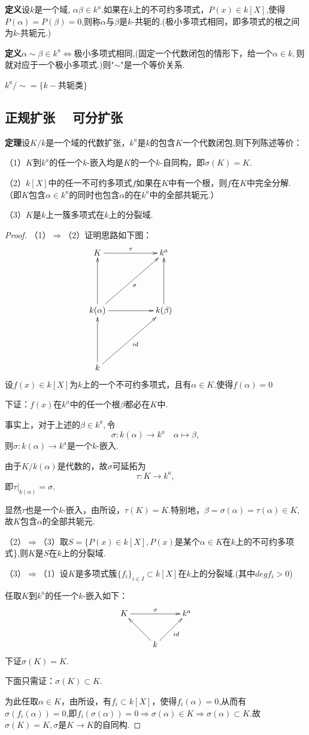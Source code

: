 \documentclass[UTF8]{article}
\begin{document}
\textbf{定义}\quad 设$k$是一个域, $\alpha \beta \in k^a.$如果在$k$上的不可约多项式，$P(x)\in k[X]$,使得$P(\alpha)=P(\beta)=0$,则称$\alpha$与$\beta$是$k$-共轭的.(极小多项式相同，即多项式的根之间为$k$-共轭元.)

\textbf{定义}\quad $\alpha\sim \beta\in k^a\iff $极小多项式相同,(固定一个代数闭包的情形下，给一个$\alpha\in k,$则就对应于一个极小多项式.)则"$\sim$"是一个等价关系.

$k^a/\sim=\{k-$共轭类\}

\subsection{正规扩张$\quad$ 可分扩张}
\normalsize

\textbf{定理}\quad 设$K/k$是一个域的代数扩张，$k^a$是$k$的包含$K$一个代数闭包,则下列陈述等价：

（1）$K$到$k^a$的任一个$k$-嵌入均是$K$的一个$k$-自同构，即$\sigma(K)=K.$

（2）$k[X]$中的任一不可约多项式$f$如果在$K$中有一个根，则$f$在$K$中完全分解.（即$K$包含$\alpha\in k^a$的同时也包含$\alpha$的在$k^a$中的全部共轭元.）

（3）$K$是$k$上一簇多项式在$k$上的分裂域.
\begin{proof}
（1）$\Longrightarrow$（2）证明思路如下图：
$$\xymatrix{K\ar[rr]^{\tau}&&{k^a}\\ \\ k(\alpha)\ar[uu]\ar[rruu]_{\sigma}\ar[rr]&&{k(\beta)}\ar[uu]&&\\ \\k\ar[uu]\ar[rruu]_{id}&&}$$
设$f(x)\in k[X]$为$k$上的一个不可约多项式，且有$\alpha\in K.$使得$f(\alpha)=0$

下证：$f(x)$在$k^a$中的任一个根$\beta$都必在$K$中.

事实上，对于上述的$\beta\in k^a,$令$$\sigma:k(\alpha)\rightarrow k^a \quad \alpha\longmapsto \beta,$$则$\sigma:k(\alpha)\rightarrow k^a$是一个$k$-嵌入.

由于$K/k(\alpha)$是代数的，故$\sigma$可延拓为$$\tau:K\rightarrow k^a,$$即$\tau|_{k(\alpha)}=\sigma.$

显然$\tau$也是一个$k$-嵌入，由所设，$\tau(K)=K.$特别地，$\beta=\sigma(\alpha)=\tau(\alpha)\in K$,故$K$包含$\alpha$的全部共轭元.

（2）$\Longrightarrow$（3）取$S=\{P(x)\in k[X],P(x)$是某个$\alpha\in K$在$k$上的不可约多项式\},则$K$是$S$在$k$上的分裂域.

（3）$\Longrightarrow$（1）设$K$是多项式簇$\{f_i\}_{i\in I}\subset k[X]$在$k$上的分裂域.(其中$degf_i>0$)

任取$K$到$k^a$的任一个$k$-嵌入如下：$$\xymatrix{K\ar[rr]^{\sigma}&&{k^a}\\& k\ar[lu] \ar[ru]_{id} & }$$下证$\sigma(K)=K.$

下面只需证：$\sigma(K)\subset K.$

为此任取$\alpha\in K$，由所设，有$f_i\subset k[X]$，使得$f_i(\alpha)=0$,从而有$\sigma(f_i(\alpha))=0$,即$f_i(\sigma(\alpha))=0\Rightarrow \sigma(\alpha)\in K \Rightarrow\sigma(\alpha)\subset K$.故$\sigma(K)=K,\sigma$是$K\rightarrow K$的自同构.
\end{proof}
\end{document}
